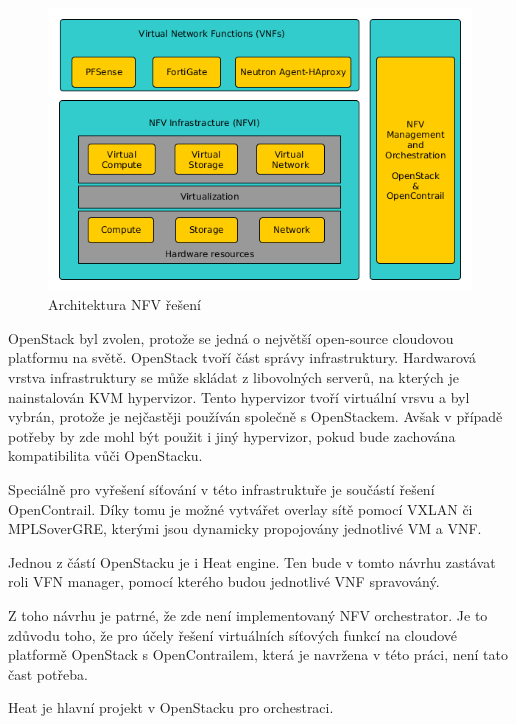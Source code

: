 \begin{figure}[h]
\begin{centering}
\includegraphics[scale=0.51]{images/VNF_overview}
\par\end{centering}
\caption{Architektura NFV řešení\label{fig:VNF_overview}}
\end{figure}

OpenStack byl zvolen, protože se jedná o největší open-source cloudovou platformu na světě. OpenStack tvoří část správy infrastruktury. Hardwarová vrstva infrastruktury se může skládat z libovolných serverů, na kterých je nainstalován KVM hypervizor. Tento hypervizor tvoří virtuální vrsvu a byl vybrán, protože je nejčastěji používán společně s OpenStackem. Avšak v případě potřeby by zde mohl být použit i jiný hypervizor, pokud bude zachována kompatibilita vůči OpenStacku.

Speciálně pro vyřešení síťování v této infrastruktuře je součástí řešení OpenContrail. Díky tomu je možné vytvářet overlay sítě pomocí VXLAN či MPLSoverGRE, kterými jsou dynamicky propojovány jednotlivé VM a VNF.

Jednou z částí OpenStacku je i Heat engine. Ten bude v tomto návrhu zastávat roli VFN manager, pomocí kterého budou jednotlivé VNF spravováný.

Z toho návrhu je patrné, že zde není implementovaný NFV orchestrator. Je to zdůvodu toho, že pro účely řešení virtuálních síťových funkcí na cloudové platformě OpenStack s OpenContrailem, která je navržena v této práci, není tato čast potřeba. 

Heat je hlavní projekt v OpenStacku pro orchestraci. 

